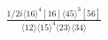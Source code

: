 \documentclass[varwidth, border=5pt]{standalone}
\begin{document}
\begin{my}
$\begin{gathered}
\scriptscriptstyle\frac{1/2i\langle16\rangle^4[16]\langle45\rangle^3[56]}{\langle12\rangle\langle15\rangle^4\langle23\rangle\langle34\rangle}
\end{gathered}$
\end{my}
\end{document}
